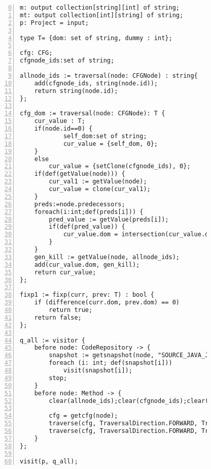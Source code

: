 \begin{figure}[ht!]
\begin{lstlisting}[numbers=left, tabsize=4, escapechar=@, caption={Dominator analysis},label={lst:dominator-code},firstline=0, firstnumber=0, lastline = 55] 
m: output collection[string][int] of string;
mt: output collection[int][string] of string;
p: Project = input;

type T= {dom: set of string, dummy : int};

cfg: CFG;
cfgnode_ids:set of string;

allnode_ids := traversal(node: CFGNode) : string{
	add(cfgnode_ids, string(node.id));
	return string(node.id);
};

cfg_dom := traversal(node: CFGNode): T {
	cur_value : T;
	if(node.id==0) {
			self_dom:set of string;
			cur_value = {self_dom, 0};
	}
	else
		cur_value = {setClone(cfgnode_ids), 0};
	if(def(getValue(node))) {
		cur_val1 := getValue(node);
		cur_value = clone(cur_val1);
	}
	preds:=node.predecessors;
	foreach(i:int;def(preds[i])) {
		pred_value := getValue(preds[i]);
		if(def(pred_value)) {
			cur_value.dom = intersection(cur_value.dom,pred_value.dom);
		}
	}	
	gen_kill := getValue(node, allnode_ids);
	add(cur_value.dom, gen_kill);
	return cur_value;
};

fixp1 := fixp(curr, prev: T) : bool {
 	if (difference(curr.dom, prev.dom) == 0)
 		return true;	
 	return false;
};

q_all := visitor {
	before node: CodeRepository -> {
		snapshot := getsnapshot(node, "SOURCE_JAVA_JLS");
		foreach (i: int; def(snapshot[i]))
			visit(snapshot[i]);
		stop;
	}
	before node: Method -> {
		clear(allnode_ids);clear(cfgnode_ids);clear(cfg_dom);

		cfg = getcfg(node);
		traverse(cfg, TraversalDirection.FORWARD, TraversalKind.HYBRID, allnode_ids);
		traverse(cfg, TraversalDirection.FORWARD, TraversalKind.HYBRID, cfg_dom, fixp1);
	}
};

visit(p, q_all);

\end{lstlisting}
\end{figure}


